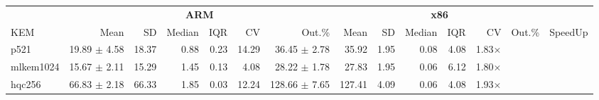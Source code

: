 \begin{table}[!ht]
\centering
\begin{tabular}{l|rrrrrr|rrrrrr|r}
\toprule
& \multicolumn{6}{c}{\bfseries ARM} & \multicolumn{6}{c}{\bfseries x86} & \\
\cmidrule(lr){2-7} \cmidrule(lr){8-13}
KEM & Mean & SD & Median & IQR & CV & Out.\% & Mean & SD & Median & IQR & CV & Out.\% & SpeedUp \\
\midrule
p521 			& 19.89 $\pm$  4.58 & 18.37 & 0.88 & 0.23 & 14.29  & 36.45 $\pm$  2.78 & 35.92 & 1.95 & 0.08 & 4.08 & 1.83× \\
mlkem1024 	& 15.67  $\pm$  2.11 & 15.29 & 1.45 & 0.13 & 4.08      & 28.22 $\pm$  1.78 & 27.83 & 1.95 & 0.06 & 6.12 & 1.80× \\
hqc256 		& 66.83 $\pm$  2.18 & 66.33 & 1.85 & 0.03 & 12.24  & 128.66 $\pm$  7.65 & 127.41 & 4.09 & 0.06 & 4.08 & 1.93× \\

\bottomrule
\end{tabular}
\end{table}
